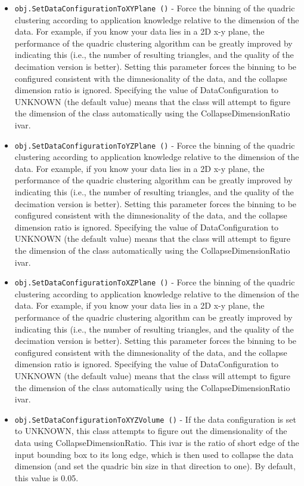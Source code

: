 \begin{itemize}
\item  \verb|obj.SetDataConfigurationToXYPlane ()| -  Force the binning of the quadric clustering according to application
 knowledge relative to the dimension of the data. For example, if you
 know your data lies in a 2D x-y plane, the performance of the quadric
 clustering algorithm can be greatly improved by indicating this (i.e.,
 the number of resulting triangles, and the quality of the decimation
 version is better). Setting this parameter forces the binning to be
 configured consistent with the dimnesionality of the data, and the
 collapse dimension ratio is ignored. Specifying the value of
 DataConfiguration to UNKNOWN (the default value) means that the class
 will attempt to figure the dimension of the class automatically using
 the CollapseDimensionRatio ivar.

\item  \verb|obj.SetDataConfigurationToYZPlane ()| -  Force the binning of the quadric clustering according to application
 knowledge relative to the dimension of the data. For example, if you
 know your data lies in a 2D x-y plane, the performance of the quadric
 clustering algorithm can be greatly improved by indicating this (i.e.,
 the number of resulting triangles, and the quality of the decimation
 version is better). Setting this parameter forces the binning to be
 configured consistent with the dimnesionality of the data, and the
 collapse dimension ratio is ignored. Specifying the value of
 DataConfiguration to UNKNOWN (the default value) means that the class
 will attempt to figure the dimension of the class automatically using
 the CollapseDimensionRatio ivar.

\item  \verb|obj.SetDataConfigurationToXZPlane ()| -  Force the binning of the quadric clustering according to application
 knowledge relative to the dimension of the data. For example, if you
 know your data lies in a 2D x-y plane, the performance of the quadric
 clustering algorithm can be greatly improved by indicating this (i.e.,
 the number of resulting triangles, and the quality of the decimation
 version is better). Setting this parameter forces the binning to be
 configured consistent with the dimnesionality of the data, and the
 collapse dimension ratio is ignored. Specifying the value of
 DataConfiguration to UNKNOWN (the default value) means that the class
 will attempt to figure the dimension of the class automatically using
 the CollapseDimensionRatio ivar.

\item  \verb|obj.SetDataConfigurationToXYZVolume ()| -  If the data configuration is set to UNKNOWN, this class attempts to
 figure out the dimensionality of the data using CollapseDimensionRatio.
 This ivar is the ratio of short edge of the input bounding box to its
 long edge, which is then used to collapse the data dimension (and set the
 quadric bin size in that direction to one). By default, this value is 0.05.


\end{itemize}
